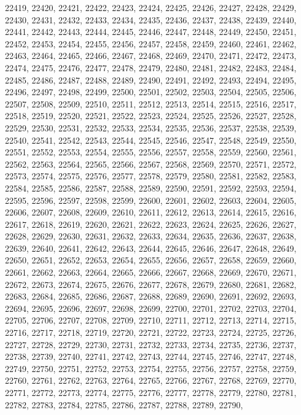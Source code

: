 22419,
22420,
22421,
22422,
22423,
22424,
22425,
22426,
22427,
22428,
22429,
22430,
22431,
22432,
22433,
22434,
22435,
22436,
22437,
22438,
22439,
22440,
22441,
22442,
22443,
22444,
22445,
22446,
22447,
22448,
22449,
22450,
22451,
22452,
22453,
22454,
22455,
22456,
22457,
22458,
22459,
22460,
22461,
22462,
22463,
22464,
22465,
22466,
22467,
22468,
22469,
22470,
22471,
22472,
22473,
22474,
22475,
22476,
22477,
22478,
22479,
22480,
22481,
22482,
22483,
22484,
22485,
22486,
22487,
22488,
22489,
22490,
22491,
22492,
22493,
22494,
22495,
22496,
22497,
22498,
22499,
22500,
22501,
22502,
22503,
22504,
22505,
22506,
22507,
22508,
22509,
22510,
22511,
22512,
22513,
22514,
22515,
22516,
22517,
22518,
22519,
22520,
22521,
22522,
22523,
22524,
22525,
22526,
22527,
22528,
22529,
22530,
22531,
22532,
22533,
22534,
22535,
22536,
22537,
22538,
22539,
22540,
22541,
22542,
22543,
22544,
22545,
22546,
22547,
22548,
22549,
22550,
22551,
22552,
22553,
22554,
22555,
22556,
22557,
22558,
22559,
22560,
22561,
22562,
22563,
22564,
22565,
22566,
22567,
22568,
22569,
22570,
22571,
22572,
22573,
22574,
22575,
22576,
22577,
22578,
22579,
22580,
22581,
22582,
22583,
22584,
22585,
22586,
22587,
22588,
22589,
22590,
22591,
22592,
22593,
22594,
22595,
22596,
22597,
22598,
22599,
22600,
22601,
22602,
22603,
22604,
22605,
22606,
22607,
22608,
22609,
22610,
22611,
22612,
22613,
22614,
22615,
22616,
22617,
22618,
22619,
22620,
22621,
22622,
22623,
22624,
22625,
22626,
22627,
22628,
22629,
22630,
22631,
22632,
22633,
22634,
22635,
22636,
22637,
22638,
22639,
22640,
22641,
22642,
22643,
22644,
22645,
22646,
22647,
22648,
22649,
22650,
22651,
22652,
22653,
22654,
22655,
22656,
22657,
22658,
22659,
22660,
22661,
22662,
22663,
22664,
22665,
22666,
22667,
22668,
22669,
22670,
22671,
22672,
22673,
22674,
22675,
22676,
22677,
22678,
22679,
22680,
22681,
22682,
22683,
22684,
22685,
22686,
22687,
22688,
22689,
22690,
22691,
22692,
22693,
22694,
22695,
22696,
22697,
22698,
22699,
22700,
22701,
22702,
22703,
22704,
22705,
22706,
22707,
22708,
22709,
22710,
22711,
22712,
22713,
22714,
22715,
22716,
22717,
22718,
22719,
22720,
22721,
22722,
22723,
22724,
22725,
22726,
22727,
22728,
22729,
22730,
22731,
22732,
22733,
22734,
22735,
22736,
22737,
22738,
22739,
22740,
22741,
22742,
22743,
22744,
22745,
22746,
22747,
22748,
22749,
22750,
22751,
22752,
22753,
22754,
22755,
22756,
22757,
22758,
22759,
22760,
22761,
22762,
22763,
22764,
22765,
22766,
22767,
22768,
22769,
22770,
22771,
22772,
22773,
22774,
22775,
22776,
22777,
22778,
22779,
22780,
22781,
22782,
22783,
22784,
22785,
22786,
22787,
22788,
22789,
22790,
